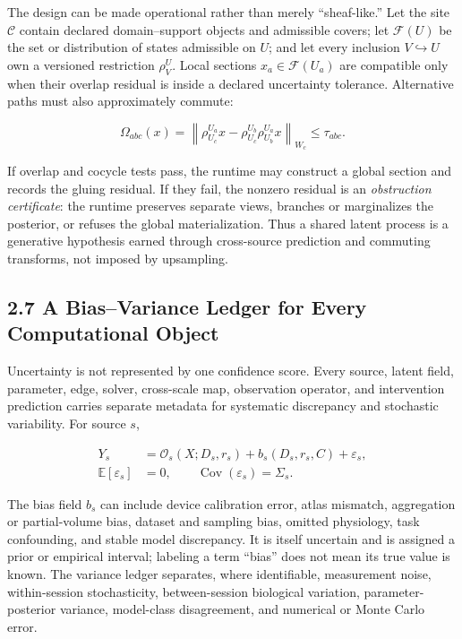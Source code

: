 The design can be made operational rather than merely ``sheaf-like.'' Let the
site \(\mathcal C\) contain declared domain--support objects and admissible
covers; let \(\mathcal F(U)\) be the set or distribution of states admissible
on \(U\); and let every inclusion \(V\hookrightarrow U\) own a versioned
restriction \(\rho^U_V\). Local sections \(x_a\in\mathcal F(U_a)\) are
compatible only when their overlap residual is inside a declared uncertainty
tolerance. Alternative paths must also approximately commute:

\[
\Omega_{abc}(x)=
\left\|\rho^{U_a}_{U_c}x-
\rho^{U_b}_{U_c}\rho^{U_a}_{U_b}x\right\|_{W_c}
\leq\tau_{abc}.
\]

If overlap and cocycle tests pass, the runtime may construct a global section
and records the gluing residual. If they fail, the nonzero residual is an
\emph{obstruction certificate}: the runtime preserves separate views,
branches or marginalizes the posterior, or refuses the global materialization.
Thus a shared latent process is a generative hypothesis earned through
cross-source prediction and commuting transforms, not imposed by upsampling.

\subsection{2.7 A Bias--Variance Ledger for Every Computational Object}

Uncertainty is not represented by one confidence score. Every source, latent
field, parameter, edge, solver, cross-scale map, observation operator, and
intervention prediction carries separate metadata for systematic discrepancy
and stochastic variability. For source \(s\),

\[
\begin{aligned}
Y_s&=\mathcal{O}_s(X;D_s,r_s)
+b_s(D_s,r_s,C)+\varepsilon_s,\\
\mathbb{E}[\varepsilon_s]&=0,\qquad
\operatorname{Cov}(\varepsilon_s)=\Sigma_s .
\end{aligned}
\]

The bias field \(b_s\) can include device calibration error, atlas mismatch,
aggregation or partial-volume bias, dataset and sampling bias, omitted
physiology, task confounding, and stable model discrepancy. It is itself
uncertain and is assigned a prior or empirical interval; labeling a term
“bias” does not mean its true value is known. The variance ledger separates,
where identifiable, measurement noise, within-session stochasticity,
between-session biological variation, parameter-posterior variance,
model-class disagreement, and numerical or Monte Carlo error.

